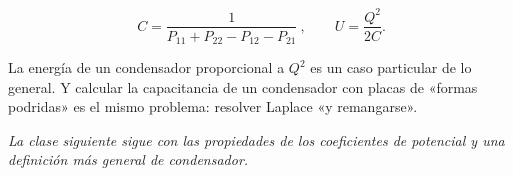 \documentclass[12pt,a4paper]{article}
\begin{document}
\begin{keybox}
\[
\boxed{\ C = \frac{1}{P_{11}+P_{22}-P_{12}-P_{21}}\ },
\qquad U = \frac{Q^2}{2C}.
\]
\end{keybox}

\begin{notebox}
La energía de un condensador proporcional a $Q^2$ es un caso particular de lo
general. Y calcular la capacitancia de un condensador con placas de «formas
podridas» es el mismo problema: resolver Laplace «y remangarse».
\end{notebox}

\medskip
\noindent\emph{La clase siguiente sigue con las propiedades de los coeficientes de
potencial y una definición más general de condensador.}
\end{document}

